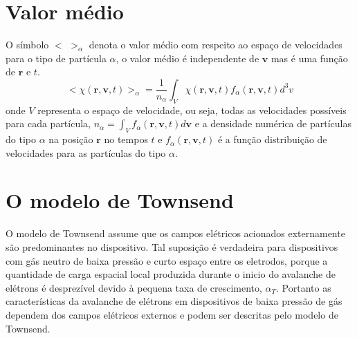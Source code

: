 \documentclass[12pt,oneside,a4paper]{abntex2}
\begin{document}
\chapter{Valor médio}
\noindent O símbolo $<$  $>_\alpha$ denota o valor médio com respeito ao espaço de velocidades para o tipo de partícula $\alpha$, o valor médio é independente de $\bm{v}$ mas é uma função de $\bm{r}$ e $t$.
\begin{equation}
<\chi(\bm{r},\bm{v},t)>_\alpha = \frac{1}{n_\alpha} \int_V \chi(\bm{r},\bm{v},t) f_\alpha(\bm{r},\bm{v},t) d^3 v
\label{anexo1}
\end{equation}
onde $V$ representa o espaço de velocidade, ou seja, todas as velocidades possíveis para cada partícula, $n_\alpha=\int_V{f_\alpha(\bm{r},\bm{v},t)}d\bm{v}$ e a densidade numérica de partículas do tipo $\alpha$ na posição $\bm{r}$ no tempos $t$ e $f_\alpha(\bm{r},\bm{v},t)$ é a função distribuição de velocidades para as partículas do tipo $\alpha$.

\chapter{O modelo de Townsend}
\label{Townsend}
\noindent O modelo de Townsend assume que os campos elétricos acionados externamente são predominantes no dispositivo. Tal suposição é verdadeira para dispositivos com gás neutro de baixa pressão e curto espaço entre os eletrodos, porque a quantidade de carga espacial local produzida durante o inicio do avalanche de elétrons é desprezível devido à pequena taxa de crescimento, $\alpha_T$. Portanto as características da avalanche de elétrons em dispositivos de baixa pressão de gás dependem dos campos elétricos externos e podem ser descritas pelo modelo de Townsend. 
\end{document}
